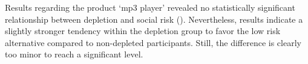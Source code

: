 Results regarding the product ‘mp3 player’ revealed no statistically significant relationship between depletion and social risk (). Nevertheless, results indicate a slightly stronger tendency within the depletion group to favor the low risk alternative compared to non-depleted participants. Still, the difference is clearly too minor to reach a significant level. 

\begin{figure}[!h]
\begin{floatrow}
\capbfigbox{%

}
\end{floatrow}
\end{figure}
